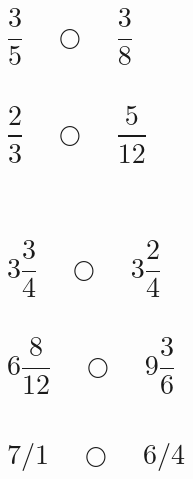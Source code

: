 \documentclass[template=tabling,81pt,headonall]{azmoon}
\begin{document}
\begin{questions}
{\begin{parts}[3]
\part{$\dfrac{3}{5} \quad \bigcirc \quad \dfrac{3}{8}$}
\part{$\dfrac{2}{3} \quad \bigcirc \quad \dfrac{5}{12}$}
‌\\\part{$3\dfrac{3}{4} \quad \bigcirc \quad 3\dfrac{2}{4}$}
\part{$6\dfrac{8}{12} \quad \bigcirc \quad 9\dfrac{3}{6}$}
\part{$7/1 \quad \bigcirc \quad 6/4$}
\end{parts}

    }
\end{questions}
\end{document}
